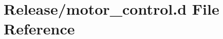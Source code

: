 \hypertarget{motor__control_8d}{}\section{Release/motor\+\_\+control.d File Reference}
\label{motor__control_8d}
